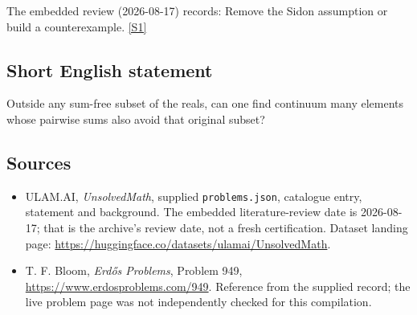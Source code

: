 \documentclass[11pt,a4paper]{article}
\newcommand{\sref}[2]{\hyperlink{source:#1:#2}{[S#2]}}
\begin{document}
The embedded review (2026-08-17) records: Remove the Sidon assumption or build a counterexample. \sref{statement}{1}

\subsection{Short English statement}

Outside any sum-free subset of the reals, can one find continuum many elements whose pairwise sums also avoid that original subset?

\subsection{Sources}

{\small

\begin{itemize}

\item[\hypertarget{source:statement:1}{S1}] ULAM.AI, \emph{UnsolvedMath}, supplied \texttt{problems.json}, catalogue entry, statement and background. The embedded literature-review date is 2026-08-17; that is the archive’s review date, not a fresh certification. Dataset landing page: \url{https://huggingface.co/datasets/ulamai/UnsolvedMath}.

\item[\hypertarget{source:statement:2}{S2}] T. F. Bloom, \emph{Erdős Problems}, Problem 949, \url{https://www.erdosproblems.com/949}. Reference from the supplied record; the live problem page was not independently checked for this compilation.

\end{itemize}

}

\label{end:statement}
\end{document}
